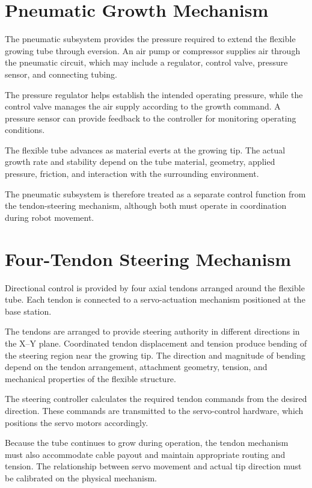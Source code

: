 \section{Pneumatic Growth Mechanism}

The pneumatic subsystem provides the pressure required to extend the flexible growing tube through eversion. An air pump or compressor supplies air through the pneumatic circuit, which may include a regulator, control valve, pressure sensor, and connecting tubing.

The pressure regulator helps establish the intended operating pressure, while the control valve manages the air supply according to the growth command. A pressure sensor can provide feedback to the controller for monitoring operating conditions.

The flexible tube advances as material everts at the growing tip. The actual growth rate and stability depend on the tube material, geometry, applied pressure, friction, and interaction with the surrounding environment.

The pneumatic subsystem is therefore treated as a separate control function from the tendon-steering mechanism, although both must operate in coordination during robot movement.

\section{Four-Tendon Steering Mechanism}

Directional control is provided by four axial tendons arranged around the flexible tube. Each tendon is connected to a servo-actuation mechanism positioned at the base station.

The tendons are arranged to provide steering authority in different directions in the X--Y plane. Coordinated tendon displacement and tension produce bending of the steering region near the growing tip. The direction and magnitude of bending depend on the tendon arrangement, attachment geometry, tension, and mechanical properties of the flexible structure.

The steering controller calculates the required tendon commands from the desired direction. These commands are transmitted to the servo-control hardware, which positions the servo motors accordingly.

Because the tube continues to grow during operation, the tendon mechanism must also accommodate cable payout and maintain appropriate routing and tension. The relationship between servo movement and actual tip direction must be calibrated on the physical mechanism.

